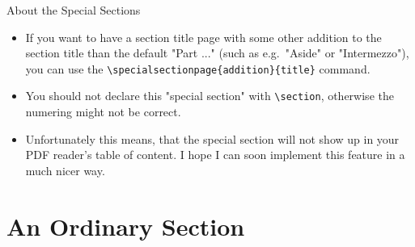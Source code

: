 \documentclass{beamer}
\begin{document}
\begin{frame}[plain]
\end{frame}

\begin{frame}{About the Special Sections}
\begin{itemize}
	\item If you want to have a section title page with some other addition to the section title than the default "Part ..." (such as e.g.~"Aside" or "Intermezzo"), you can use the \texttt{\textbackslash{}specialsectionpage\{addition\}\{title\}} command.
	\item You should not declare this "special section" with \texttt{\textbackslash{}section}, otherwise the \alert{numering might not be correct}.
	\item Unfortunately this means, that the special section will not show up in your PDF reader's table of content. I hope I can soon implement this feature in a much nicer way.
\end{itemize}
\end{frame}


\section*{An Ordinary Section}

\begin{frame}[plain]
\sectionpage
\end{frame}
\end{document}
